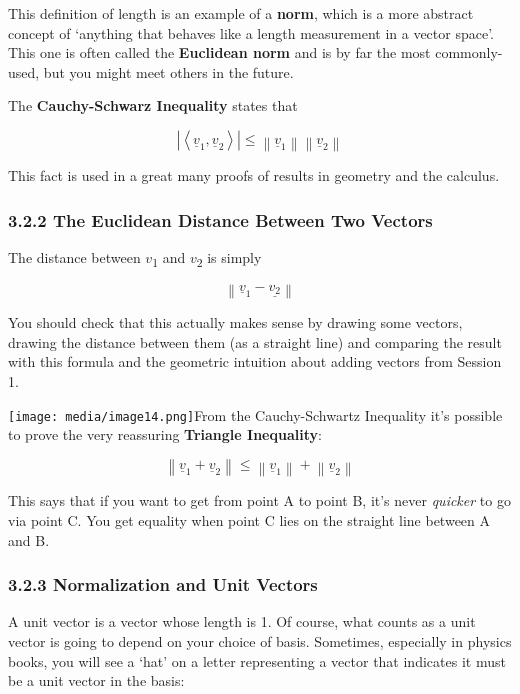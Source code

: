 \documentclass[oneside,english]{amsbook}
\numberwithin{section}{chapter}
\theoremstyle{plain}
\theoremstyle{definition}
\begin{document}
This definition of length is an example of a \textbf{norm}, which is a
more abstract concept of `anything that behaves like a length
measurement in a vector space'. This one is often called the
\textbf{Euclidean norm} and is by far the most commonly-used, but you
might meet others in the future.

The \textbf{Cauchy-Schwarz Inequality} states that

\[\left| \left\langle {\underline{v}}_{1},{\underline{v}}_{2} \right\rangle \right| \leq \left\| {\underline{v}}_{1} \right\|\left\| {\underline{v}}_{2} \right\|\]

This fact is used in a great many proofs of results in geometry and the
calculus.

\subsubsection{3.2.2 The Euclidean Distance Between Two
	Vectors}\label{the-euclidean-distance-between-two-vectors}

The distance between $v$\textsubscript{1} and $v$\textsubscript{2}
is simply

\[\left\| {\underline{v}}_{1} - \underline{v_{2}} \right\|\]

You should check that this actually makes sense by drawing some vectors,
drawing the distance between them (as a straight line) and comparing the
result with this formula and the geometric intuition about adding
vectors from Session 1.

\texttt{[image: media/image14.png]}From
the Cauchy-Schwartz Inequality it's possible to prove the very
reassuring \textbf{Triangle Inequality}:

\[\left\| {\underline{v}}_{1} + {\underline{v}}_{2} \right\| \leq \left\| {\underline{v}}_{1} \right\| + \left\| {\underline{v}}_{2} \right\|\]

This says that if you want to get from point A to point B, it's never
\emph{quicker} to go via point C. You get equality when point C lies on
the straight line between A and B.

\subsubsection{3.2.3 Normalization and Unit
	Vectors}\label{normalization-and-unit-vectors}

A unit vector is a vector whose length is 1. Of course, what counts as a
unit vector is going to depend on your choice of basis. Sometimes,
especially in physics books, you will see a `hat' on a letter
representing a vector that indicates it must be a unit vector in the
basis:
\end{document}

